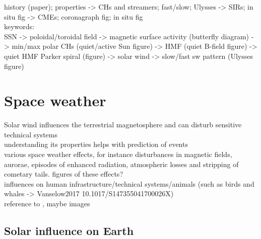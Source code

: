 

history (paper); properties -> CHs and streamers; fast/slow; Ulysses -> SIRs; in situ fig -> CMEs; coronagraph fig; in situ fig\\

keywords:\\
SSN -> poloidal/toroidal field -> magnetic surface activity (butterfly diagram) -> min/max polar CHs (quiet/active Sun figure) -> HMF (quiet B-field figure) -> quiet HMF Parker spiral (figure) -> solar wind -> slow/fast sw pattern (Ulysses figure)\\



\section{Space weather}
\label{sec:space_weather}

Solar wind influences the terrestrial magnetosphere and can disturb sensitive technical systems\\
understanding its properties helps with prediction of events\\

various space weather effects, for instance disturbances in magnetic fields, aurorae, episodes of enhanced radiation, atmospheric losses and stripping of cometary tails. figures of these effects?\\

influences on human infrastructure/technical systems/animals (such as birds and whales -> Vanselow2017 10.1017/S147355041700026X)\\

reference to \citet{Bothmer2007}, maybe images\\

\subsection{Solar influence on Earth}
\label{sec:solar_influence_on_earth}

